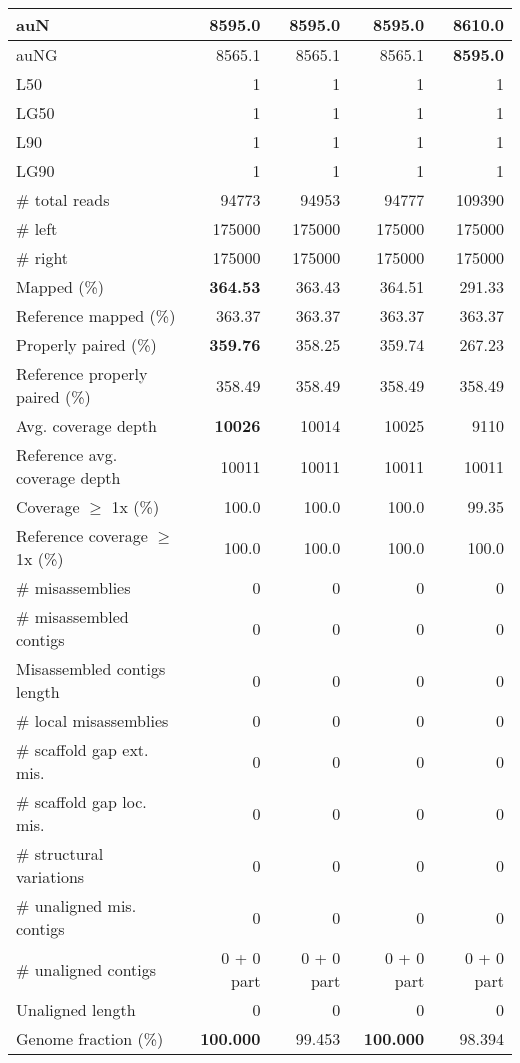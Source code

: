 \documentclass[12pt,a4paper]{article}
\begin{document}
\begin{table}[ht]
\begin{center}
\begin{tabular}{|l*{4}{|r}|}
auN & 8595.0 & 8595.0 & 8595.0 & {\bf 8610.0} \\ \hline
auNG & 8565.1 & 8565.1 & 8565.1 & {\bf 8595.0} \\ \hline
L50 & 1 & 1 & 1 & 1 \\ \hline
LG50 & 1 & 1 & 1 & 1 \\ \hline
L90 & 1 & 1 & 1 & 1 \\ \hline
LG90 & 1 & 1 & 1 & 1 \\ \hline
\# total reads & 94773 & 94953 & 94777 & 109390 \\ \hline
\# left & 175000 & 175000 & 175000 & 175000 \\ \hline
\# right & 175000 & 175000 & 175000 & 175000 \\ \hline
Mapped (\%) & {\bf 364.53} & 363.43 & 364.51 & 291.33 \\ \hline
Reference mapped (\%) & 363.37 & 363.37 & 363.37 & 363.37 \\ \hline
Properly paired (\%) & {\bf 359.76} & 358.25 & 359.74 & 267.23 \\ \hline
Reference properly paired (\%) & 358.49 & 358.49 & 358.49 & 358.49 \\ \hline
Avg. coverage depth & {\bf 10026} & 10014 & 10025 & 9110 \\ \hline
Reference avg. coverage depth & 10011 & 10011 & 10011 & 10011 \\ \hline
Coverage $\geq$ 1x (\%) & 100.0 & 100.0 & 100.0 & 99.35 \\ \hline
Reference coverage $\geq$ 1x (\%) & 100.0 & 100.0 & 100.0 & 100.0 \\ \hline
\# misassemblies & 0 & 0 & 0 & 0 \\ \hline
\# misassembled contigs & 0 & 0 & 0 & 0 \\ \hline
Misassembled contigs length & 0 & 0 & 0 & 0 \\ \hline
\# local misassemblies & 0 & 0 & 0 & 0 \\ \hline
\# scaffold gap ext. mis. & 0 & 0 & 0 & 0 \\ \hline
\# scaffold gap loc. mis. & 0 & 0 & 0 & 0 \\ \hline
\# structural variations & 0 & 0 & 0 & 0 \\ \hline
\# unaligned mis. contigs & 0 & 0 & 0 & 0 \\ \hline
\# unaligned contigs & 0 + 0 part & 0 + 0 part & 0 + 0 part & 0 + 0 part \\ \hline
Unaligned length & 0 & 0 & 0 & 0 \\ \hline
Genome fraction (\%) & {\bf 100.000} & 99.453 & {\bf 100.000} & 98.394 \\ \hline

\end{tabular}
\end{center}
\end{table}
\end{document}
